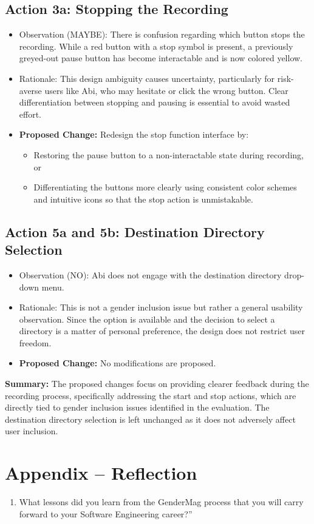 \documentclass[12pt, titlepage]{article}
\begin{document}
\subsection{Action 3a: Stopping the Recording}
\begin{itemize}
  \item Observation (MAYBE): There is confusion regarding which button stops the recording. While a red button with a 
  stop symbol is present, a previously greyed-out pause button has become interactable and is now colored yellow.
  \item Rationale: This design ambiguity causes uncertainty, particularly for risk-averse users like Abi, 
  who may hesitate or click the wrong button. Clear differentiation between stopping and pausing is essential to 
  avoid wasted effort.
  \item \textbf{Proposed Change:} Redesign the stop function interface by:
  \begin{itemize}
    \item Restoring the pause button to a non-interactable state during recording, or
    \item Differentiating the buttons more clearly using consistent color schemes and intuitive icons so that 
    the stop action is unmistakable.
  \end{itemize}
\end{itemize}

\subsection{Action 5a and 5b: Destination Directory Selection}
\begin{itemize}
  \item Observation (NO): Abi does not engage with the destination directory drop-down menu.
  \item Rationale: This is not a gender inclusion issue but rather a general usability observation. 
  Since the option is available and the decision to select a directory is a matter of personal preference, 
  the design does not restrict user freedom.
  \item \textbf{Proposed Change:} No modifications are proposed.
\end{itemize}

\noindent
\textbf{Summary:} The proposed changes focus on providing clearer feedback during the recording process, 
specifically addressing the start and stop actions, which are directly tied to gender inclusion issues 
identified in the evaluation. The destination directory selection is left unchanged as it does not adversely 
affect user inclusion.

\newpage
\section*{Appendix -- Reflection}
\begin{enumerate}
  \item What lessons did you learn from the GenderMag process that you will carry forward to your Software Engineering career?”
\end{enumerate}
\end{document}
